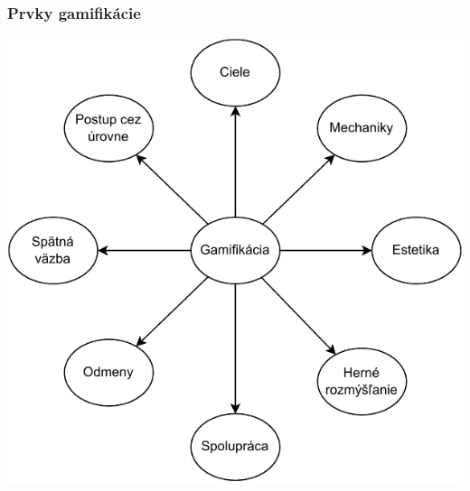 \documentclass{beamer}
\begin{document}
\begin{frame}[fragile=singleslide,plain]\frametitle{Prvky gamifikácie}
\begin{center}
\includegraphics[scale=.6]{prvky.pdf}

\end{center}
\end{frame}
\end{document}
